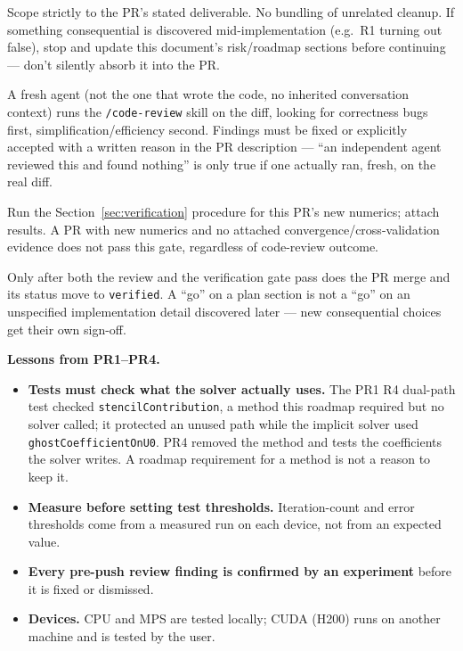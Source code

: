\documentclass[11pt]{article}
\begin{document}
\begin{description}[leftmargin=*,style=nextline]
\item[Implement] Scope strictly to the PR's stated deliverable. No bundling
of unrelated cleanup. If something consequential is discovered
mid-implementation (e.g.\ R1 turning out false), stop and update this
document's risk/roadmap sections before continuing --- don't silently absorb
it into the PR.
\item[Independent reviewer agent] A fresh agent (not the one that wrote the
code, no inherited conversation context) runs the \texttt{/code-review}
skill on the diff, looking for correctness bugs first,
simplification/efficiency second. Findings must be fixed or explicitly
accepted with a written reason in the PR description --- ``an independent
agent reviewed this and found nothing'' is only true if one actually ran,
fresh, on the real diff.
\item[Physics verification gate] Run the Section~\ref{sec:verification}
procedure for this PR's new numerics; attach results. A PR with new
numerics and no attached convergence/cross-validation evidence does not
pass this gate, regardless of code-review outcome.
\item[Merge / go-no-go] Only after both the review and the verification
gate pass does the PR merge and its status move to \texttt{verified}. A
``go'' on a plan section is not a ``go'' on an unspecified implementation
detail discovered later --- new consequential choices get their own
sign-off.
\end{description}

\textbf{Lessons from PR1--PR4.}
\begin{itemize}[leftmargin=*]
\item \textbf{Tests must check what the solver actually uses.} The PR1 R4
dual-path test checked \texttt{stencilContribution}, a method this roadmap
required but no solver called; it protected an unused path while the
implicit solver used \texttt{ghostCoefficientOnU0}. PR4 removed the method
and tests the coefficients the solver writes. A roadmap requirement for a
method is not a reason to keep it.
\item \textbf{Measure before setting test thresholds.} Iteration-count and
error thresholds come from a measured run on each device, not from an
expected value.
\item \textbf{Every pre-push review finding is confirmed by an experiment}
before it is fixed or dismissed.
\item \textbf{Devices.} CPU and MPS are tested locally; CUDA (H200) runs on
another machine and is tested by the user.
\end{itemize}
\end{document}
